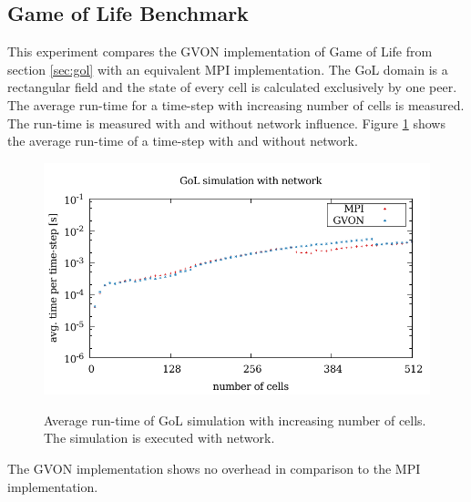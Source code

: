 \subsection{Game of Life Benchmark}
This experiment compares the GVON implementation of Game of Life from
section \ref{sec:gol} with an equivalent MPI implementation. The GoL
domain is a rectangular field and the state of every cell is
calculated exclusively by one peer. The average run-time for a
time-step with increasing number of cells is measured. The run-time is
measured with and without network influence.  Figure
\ref{fig:gol_laser} shows the average run-time of a time-step with and
without network.

\begin{figure}[H]
    \includegraphics[width=\textwidth]{plots/50_gol_network_laser}
  \label{fig:gol_laser}
  \caption{Average run-time of GoL simulation with increasing number
    of cells. The simulation is executed with network.}
\end{figure}

The GVON implementation shows no overhead in comparison to the MPI
implementation.


